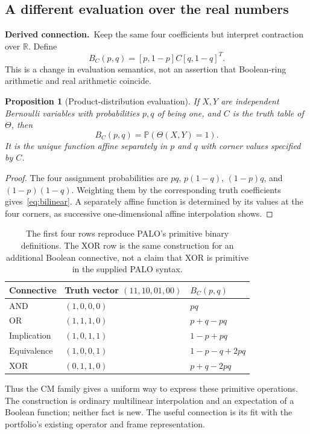 \documentclass[11pt,a4paper]{article}
\newtheorem{proposition}{Proposition}[section]
\theoremstyle{remark}
\newcommand{\R}{\mathbb R}
\newcommand{\Prob}{\mathbb P}
\newcommand{\derived}{\textbf{Derived connection.}\ }
\begin{document}
\subsection{A different evaluation over the real numbers}
\derived Keep the same four coefficients but interpret contraction over $\R$. Define
\begin{equation}
 B_C(p,q)=[p,1-p]C[q,1-q]^T.
 \label{eq:bilinear}
\end{equation}
This is a change in evaluation semantics, not an assertion that Boolean-ring arithmetic and real arithmetic coincide.

\begin{proposition}[Product-distribution evaluation]
If $X,Y$ are independent Bernoulli variables with probabilities $p,q$ of being one, and $C$ is the truth table of $\Theta$, then
\[
B_C(p,q)=\Prob(\Theta(X,Y)=1).
\]
It is the unique function affine separately in $p$ and $q$ with corner values specified by $C$.
\end{proposition}
\begin{proof}
The four assignment probabilities are $pq$, $p(1-q)$, $(1-p)q$, and $(1-p)(1-q)$. Weighting them by the corresponding truth coefficients gives~\eqref{eq:bilinear}. A separately affine function is determined by its values at the four corners, as successive one-dimensional affine interpolation shows.
\end{proof}

\begin{table}[htbp]
\centering
\begin{tabular}{@{}lll@{}}
\toprule
Connective & Truth vector $(11,10,01,00)$ & $B_C(p,q)$\\
\midrule
AND & $(1,0,0,0)$ & $pq$\\
OR & $(1,1,1,0)$ & $p+q-pq$\\
Implication & $(1,0,1,1)$ & $1-p+pq$\\
Equivalence & $(1,0,0,1)$ & $1-p-q+2pq$\\
XOR & $(0,1,1,0)$ & $p+q-2pq$\\
\bottomrule
\end{tabular}
\caption{The first four rows reproduce PALO's primitive binary definitions. The XOR row is the same construction for an additional Boolean connective, not a claim that XOR is primitive in the supplied PALO syntax.}
\end{table}

Thus the CM family gives a uniform way to express these primitive operations. The construction is ordinary multilinear interpolation and an expectation of a Boolean function; neither fact is new. The useful connection is its fit with the portfolio's existing operator and frame representation.
\end{document}
